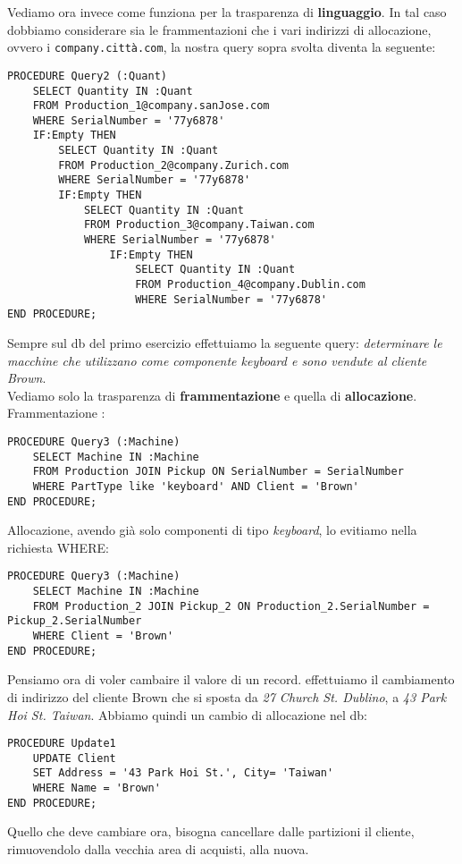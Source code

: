Vediamo ora invece come funziona per la trasparenza di \textbf{linguaggio}. In tal caso dobbiamo considerare sia le frammentazioni che i vari indirizzi di allocazione, ovvero i \texttt{company.città.com}, la nostra query sopra svolta diventa la seguente:
\begin{lstlisting}
PROCEDURE Query2 (:Quant)
    SELECT Quantity IN :Quant
    FROM Production_1@company.sanJose.com
    WHERE SerialNumber = '77y6878'
    IF:Empty THEN 
        SELECT Quantity IN :Quant
        FROM Production_2@company.Zurich.com
        WHERE SerialNumber = '77y6878'
        IF:Empty THEN 
            SELECT Quantity IN :Quant
            FROM Production_3@company.Taiwan.com
            WHERE SerialNumber = '77y6878'
                IF:Empty THEN 
                    SELECT Quantity IN :Quant
                    FROM Production_4@company.Dublin.com
                    WHERE SerialNumber = '77y6878'
END PROCEDURE;
\end{lstlisting}

Sempre sul db del primo esercizio effettuiamo la seguente query: 
\textit{determinare le macchine che utilizzano come componente \textit{keyboard} e sono vendute al cliente \textit{Brown}}.\\ Vediamo solo la trasparenza di \textbf{frammentazione} e quella di \textbf{allocazione}.\\
Frammentazione : \\
\begin{lstlisting}
PROCEDURE Query3 (:Machine)
    SELECT Machine IN :Machine
    FROM Production JOIN Pickup ON SerialNumber = SerialNumber
    WHERE PartType like 'keyboard' AND Client = 'Brown'
END PROCEDURE;
\end{lstlisting}

Allocazione, avendo già solo componenti di tipo \textit{keyboard}, lo evitiamo nella richiesta WHERE:
\begin{lstlisting}
PROCEDURE Query3 (:Machine)
    SELECT Machine IN :Machine
    FROM Production_2 JOIN Pickup_2 ON Production_2.SerialNumber = Pickup_2.SerialNumber
    WHERE Client = 'Brown'
END PROCEDURE;
\end{lstlisting}

Pensiamo ora di voler cambaire il valore di un record. effettuiamo il cambiamento di indirizzo del cliente Brown che si sposta da \textit{27 Church St.  Dublino}, a \textit{43 Park Hoi St. Taiwan}. Abbiamo quindi un cambio di allocazione nel db:

\begin{lstlisting}
PROCEDURE Update1
    UPDATE Client
    SET Address = '43 Park Hoi St.', City= 'Taiwan'
    WHERE Name = 'Brown'
END PROCEDURE;
\end{lstlisting}
Quello che deve cambiare ora, bisogna cancellare dalle partizioni il cliente, rimuovendolo dalla vecchia area di acquisti, alla nuova. 

